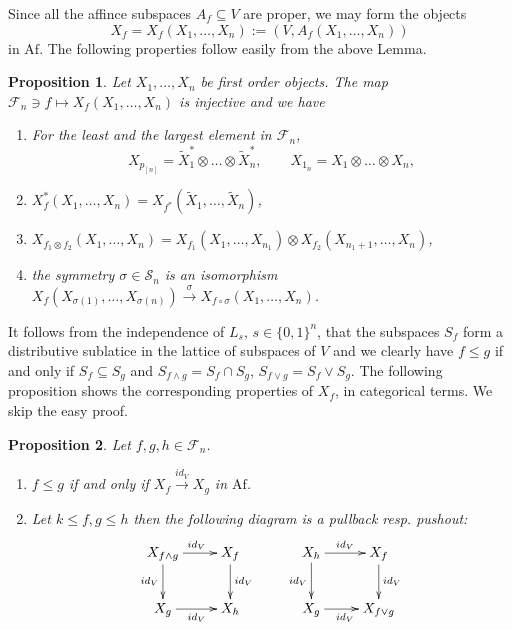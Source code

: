 \documentclass[12pt]{article}
\newtheorem{prop}{Proposition}
\theoremstyle{definition}
\theoremstyle{remark}
\def\Fe{\mathcal F}
\def\permut{\mathscr{S}}
\def \Af{\mathrm{Af}}
\begin{document}
Since all the affince subspaces  $A_f\subseteq V$ are proper, we may form the objects
\[
X_f=X_f(X_1,\dots, X_n):=(V,A_f(X_1,\dots,X_n))
\]
in $\Af$. The following properties follow easily from the above Lemma.

\begin{prop}\label{prop:Xf_const} Let $X_1,\dots,X_n$ be first order objects. 
The map $\Fe_n\ni f\mapsto X_f(X_1,\dots,X_n)$ is injective and we have 
\begin{enumerate}
\item[(i)] For the least and the largest element in $\Fe_n$, 
\[
X_{p_{[n]}}=\tilde X_1^*\otimes \dots\otimes \tilde X_n^*,\qquad
X_{1_n}=X_1\otimes\dots\otimes X_n,
\]

\item[(ii)] $X_f^*(X_1,\dots,X_n)=X_{f^*}(\tilde X_1,\dots,\tilde X_n)$,
\item[(iii)] $X_{f_1\otimes f_2}(X_1,\dots,X_n)=X_{f_1}(X_1,\dots, X_{n_1})\otimes
X_{f_2}(X_{n_1+1},\dots,X_n)$,
\item[(iv)]  the symmetry $\sigma\in \permut_n$ is an isomorphism $X_f(X_{\sigma(1)},\dots,
X_{\sigma(n)})\xrightarrow{\sigma} X_{f\circ\sigma}(X_1,\dots,X_n)$. 
\end{enumerate}
\end{prop}

It follows from the independence of $L_s$, $s\in \{0,1\}^n$, that  the subspaces $S_f$ form a
distributive sublatice in the lattice of subspaces of $V$ and we clearly have 
$f\le g$ if and only if $S_f\subseteq S_g$ and $S_{f\wedge g}=S_f\cap S_g$, $S_{f\vee
g}=S_f\vee S_g$. 
The following proposition shows the corresponding properties of $X_f$, in categorical
terms. We skip the easy proof.

\begin{prop} Let $f,g,h\in \Fe_n$. 
\begin{enumerate} 
\item[(i)] $f\le g$ if and only if $X_f\xrightarrow{id_V} X_g$ in $\Af$. 
\item[(ii)] Let $k\le f,g\le h$ then the following diagram is a pullback resp. pushout: 
\[
\xymatrix{
X_{f\wedge g}\ar[r]^{id_V}
\ar[d]_{id_V} & X_f\ar[d]^{id_V} \\
X_g \ar[r]_{id_V}& X_h
} \qquad 
\xymatrix{
X_{h}\ar[r]^{id_V}
\ar[d]_{id_V} & X_f\ar[d]^{id_V} \\
X_g \ar[r]_{id_V}& X_{f\vee g}
}
\]

\end{enumerate}

\end{prop}
\end{document}
